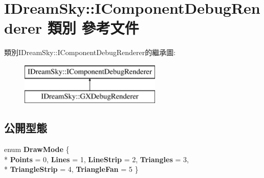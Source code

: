 \hypertarget{class_i_dream_sky_1_1_i_component_debug_renderer}{}\section{I\+Dream\+Sky\+:\+:I\+Component\+Debug\+Renderer 類別 參考文件}
\label{class_i_dream_sky_1_1_i_component_debug_renderer}
類別\+I\+Dream\+Sky\+:\+:I\+Component\+Debug\+Renderer的繼承圖\+:\begin{figure}[H]
\begin{center}
\leavevmode
\includegraphics[height=2.000000cm]{class_i_dream_sky_1_1_i_component_debug_renderer}
\end{center}
\end{figure}
\subsection*{公開型態}
\begin{DoxyCompactItemize}
\item 
enum {\bfseries Draw\+Mode} \{ \\*
{\bfseries Points} = 0, 
{\bfseries Lines} = 1, 
{\bfseries Line\+Strip} = 2, 
{\bfseries Triangles} = 3, 
\\*
{\bfseries Triangle\+Strip} = 4, 
{\bfseries Triangle\+Fan} = 5
 \}\hypertarget{class_i_dream_sky_1_1_i_component_debug_renderer_ac4e1eaf61e2d20449532c16ca30652f9}{}\label{class_i_dream_sky_1_1_i_component_debug_renderer_ac4e1eaf61e2d20449532c16ca30652f9}

\end{DoxyCompactItemize}
